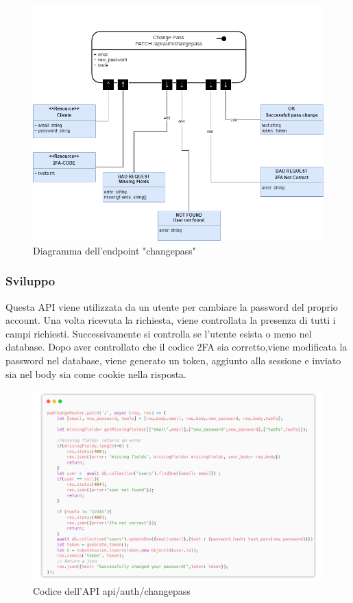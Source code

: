 \documentclass{report}
\begin{document}
\begin{figure}[H]
	\centering\includegraphics[width=1\textwidth]{images/microservizio-autenticazione/diagrams/diagramma_changepass.drawio.png}
	\caption{Diagramma dell'endpoint "changepass"}
\end{figure}
\subsubsection*{Sviluppo}
Questa API viene utilizzata da un utente per cambiare la password del proprio account.
Una volta ricevuta la richiesta, viene controllata la presenza di tutti i campi richiesti.
Successivamente si controlla se l'utente esista o meno nel database.
Dopo aver controllato che il codice 2FA sia corretto,viene modificata la password nel database, viene generato un token, aggiunto alla sessione e inviato sia nel body sia come cookie nella risposta.

\begin{figure}[H]
	\centering\includegraphics[width=1\textwidth]{images/microservizio-autenticazione/changepass-carbon.png}
	Codice dell'API api/auth/changepass
\end{figure}
\end{document}
